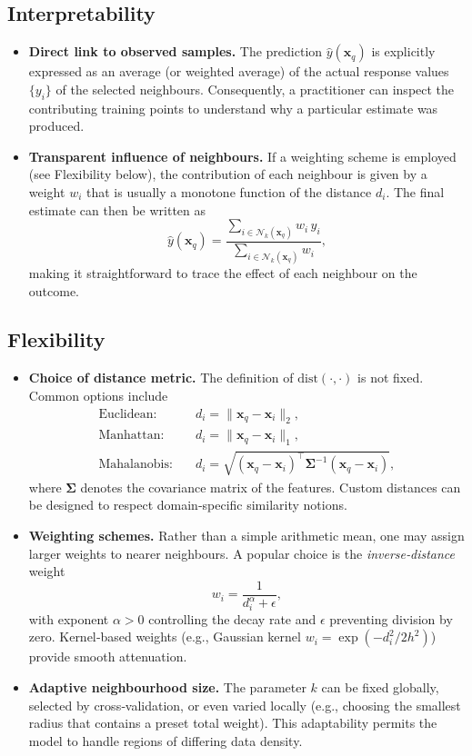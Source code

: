 \documentclass[12pt, a4paper]{article}
\begin{document}
\subsection{Interpretability}
\begin{itemize}
    \item \textbf{Direct link to observed samples.}  The prediction \(\hat{y}(\mathbf{x}_q)\) is explicitly expressed as an average (or weighted average) of the actual response values \(\{y_i\}\) of the selected neighbours.  Consequently, a practitioner can inspect the contributing training points to understand why a particular estimate was produced.
    \item \textbf{Transparent influence of neighbours.}  If a weighting scheme is employed (see Flexibility below), the contribution of each neighbour is given by a weight \(w_i\) that is usually a monotone function of the distance \(d_i\).  The final estimate can then be written as
    \[
    \hat{y}(\mathbf{x}_q)=\frac{\sum_{i\in\mathcal N_k(\mathbf{x}_q)} w_i\, y_i}{\sum_{i\in\mathcal N_k(\mathbf{x}_q)} w_i},
    \]
    making it straightforward to trace the effect of each neighbour on the outcome.
\end{itemize}

\subsection{Flexibility}
\begin{itemize}
    \item \textbf{Choice of distance metric.}  The definition of \(\mathrm{dist}(\cdot,\cdot)\) is not fixed.  Common options include
    \[
    \begin{aligned}
    \text{Euclidean:}&\quad d_i = \|\mathbf{x}_q-\mathbf{x}_i\|_2,\\[4pt]
    \text{Manhattan:}&\quad d_i = \|\mathbf{x}_q-\mathbf{x}_i\|_1,\\[4pt]
    \text{Mahalanobis:}&\quad d_i = \sqrt{(\mathbf{x}_q-\mathbf{x}_i)^\top\mathbf\Sigma^{-1}(\mathbf{x}_q-\mathbf{x}_i)},
    \end{aligned}
    \]
    where \(\mathbf\Sigma\) denotes the covariance matrix of the features.  Custom distances can be designed to respect domain‑specific similarity notions.
    \item \textbf{Weighting schemes.}  Rather than a simple arithmetic mean, one may assign larger weights to nearer neighbours.  A popular choice is the \emph{inverse‑distance} weight
    \[
    w_i = \frac{1}{d_i^\alpha + \epsilon},
    \]
    with exponent \(\alpha>0\) controlling the decay rate and \(\epsilon\) preventing division by zero.  Kernel‑based weights (e.g., Gaussian kernel \(w_i = \exp(-d_i^2 / 2h^2)\)) provide smooth attenuation.
    \item \textbf{Adaptive neighbourhood size.}  The parameter \(k\) can be fixed globally, selected by cross‑validation, or even varied locally (e.g., choosing the smallest radius that contains a preset total weight).  This adaptability permits the model to handle regions of differing data density.
\end{itemize}
\end{document}
